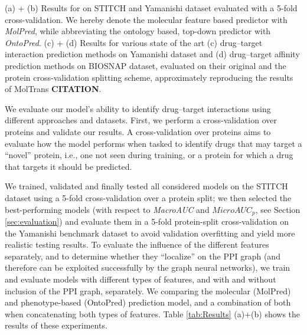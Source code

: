 \documentclass{bioinfo}
\begin{document}
\begin{table}[!tpb]
	\caption{(a) + (b) Results for \name on STITCH and Yamanishi dataset evaluated with a 5-fold cross-validation. We hereby denote the molecular feature based predictor with \textit{MolPred}, while abbreviating the ontology based, top-down predictor with \textit{OntoPred}. (c) + (d) Results for various state of the art (c) drug--target interaction prediction methods on Yamanishi dataset and (d) drug--target affinity prediction methods on BIOSNAP dataset, evaluated on their original and the protein cross-validation splitting scheme, approximately reproducing the results of MolTrans \textbf{CITATION}.}
	\label{tab:Results}
\end{table}

We evaluate our model's ability to identify drug--target interactions
using different approaches and datasets. First, we perform a
cross-validation over proteins and validate our results. A
cross-validation over proteins aims to evaluate how the model performs
when tasked to identify drugs that may target a ``novel'' protein,
i.e., one not seen during training, or a protein for which a drug that
targets it should be predicted. 

We trained, validated and finally tested all considered models on the
STITCH dataset using a 5-fold cross-validation over a protein split;
we then selected the best-performing models (with respect to
\textit{MacroAUC} and $MicroAUC_p$, see Section \ref{sec:evaluation})
and evaluate them in a 5-fold protein-split cross-validation on the
Yamanishi benchmark dataset to avoid validation overfitting and yield
more realistic testing results. To evaluate the influence of the
different features separately, and to determine whether they
``localize'' on the PPI graph (and therefore can be exploited
successfully by the graph neural networks), we train and evaluate
models with different types of features, and with and without
inclusion of the PPI graph, separately. We comparing the molecular
(MolPred) and phenotype-based (OntoPred) prediction model, and a
combination of both when concatenating both types of features.  Table
\ref{tab:Results} (a)+(b) shows the results of these experiments.
\end{document}
